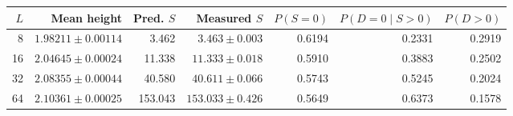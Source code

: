 \begin{tabular}{@{}rrrrrrr@{}}
\toprule
$L$ & Mean height & Pred. $S$ & Measured $S$ & $P(S=0)$ & $P(D=0\mid S>0)$ & $P(D>0)$ \\
\midrule
8 & $1.98211 \pm 0.00114$ & 3.462 & $3.463 \pm 0.003$ & 0.6194 & 0.2331 & 0.2919 \\
16 & $2.04645 \pm 0.00024$ & 11.338 & $11.333 \pm 0.018$ & 0.5910 & 0.3883 & 0.2502 \\
32 & $2.08355 \pm 0.00044$ & 40.580 & $40.611 \pm 0.066$ & 0.5743 & 0.5245 & 0.2024 \\
64 & $2.10361 \pm 0.00025$ & 153.043 & $153.033 \pm 0.426$ & 0.5649 & 0.6373 & 0.1578 \\
\bottomrule
\end{tabular}
